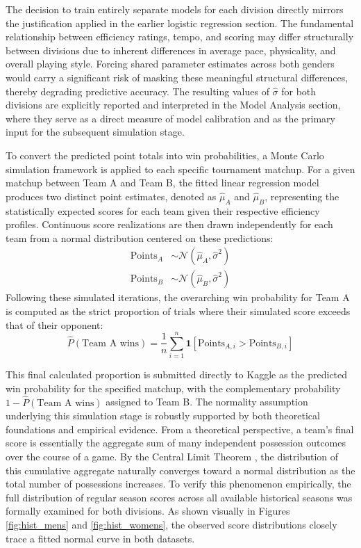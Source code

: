 \documentclass[12pt,leqno]{article}\usepackage[pdftex]{graphicx}\usepackage[dvipsnames]{xcolor}
\theoremstyle{remark}
\begin{document}
The decision to train entirely separate models for each division directly mirrors the justification applied in the earlier logistic regression section. The fundamental relationship between efficiency ratings, tempo, and scoring may differ structurally between divisions due to inherent differences in average pace, physicality, and overall playing style. Forcing shared parameter estimates across both genders would carry a significant risk of masking these meaningful structural differences, thereby degrading predictive accuracy. The resulting values of $\hat{\sigma}$ for both divisions are explicitly reported and interpreted in the Model Analysis section, where they serve as a direct measure of model calibration and as the primary input for the subsequent simulation stage.

To convert the predicted point totals into win probabilities, a Monte Carlo simulation framework is applied to each specific tournament matchup. For a given matchup between Team A and Team B, the fitted linear regression model produces two distinct point estimates, denoted as $\hat{\mu}_A$ and $\hat{\mu}_B$, representing the statistically expected scores for each team given their respective efficiency profiles. Continuous score realizations are then drawn independently for each team from a normal distribution centered on these predictions:
\begin{align}
\text{Points}_A &\sim \mathcal{N}(\hat{\mu}_A, \hat{\sigma}^2) \\
\text{Points}_B &\sim \mathcal{N}(\hat{\mu}_B, \hat{\sigma}^2)
\end{align}
Following these simulated iterations, the overarching win probability for Team A is computed as the strict proportion of trials where their simulated score exceeds that of their opponent:
\begin{equation}
\hat{P}(\text{Team A wins}) = \frac{1}{n} \sum_{i=1}^{n} \mathbf{1}[\text{Points}_{A,i} > \text{Points}_{B,i}]
\end{equation}

This final calculated proportion is submitted directly to Kaggle as the predicted win probability for the specified matchup, with the complementary probability $1 - \hat{P}(\text{Team A wins})$ assigned to Team B. The normality assumption underlying this simulation stage is robustly supported by both theoretical foundations and empirical evidence. From a theoretical perspective, a team's final score is essentially the aggregate sum of many independent possession outcomes over the course of a game. By the Central Limit Theorem \cite{CLT}, the distribution of this cumulative aggregate naturally converges toward a normal distribution as the total number of possessions increases. To verify this phenomenon empirically, the full distribution of regular season scores across all available historical seasons was formally examined for both divisions. As shown visually in Figures \ref{fig:hist_mens} and \ref{fig:hist_womens}, the observed score distributions closely trace a fitted normal curve in both datasets.
\end{document}
